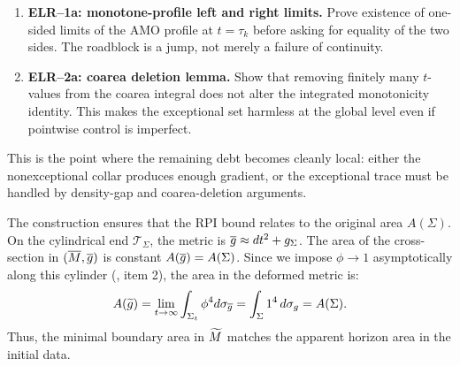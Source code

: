 \begin{remark}
\begin{enumerate}
    \item \textbf{ELR--1a: monotone-profile left and right limits.}
    Prove existence of one-sided limits of the AMO profile at \(t=\tau_k\)
    before asking for equality of the two sides.  The roadblock is a jump, not
    merely a failure of continuity.

    \item \textbf{ELR--2a: coarea deletion lemma.}
    Show that removing finitely many \(t\)-values from the coarea integral
    does not alter the integrated monotonicity identity.  This makes the
    exceptional set harmless at the global level even if pointwise control is
    imperfect.
\end{enumerate}
This is the point where the remaining debt becomes cleanly local: either the
nonexceptional collar produces enough gradient, or the exceptional trace must
be handled by density-gap and coarea-deletion arguments.
\end{remark}

\begin{proposition}\label{prop:AreaPreservation}
The construction ensures that the RPI bound relates to the original area $A(\Sigma)$.
On the cylindrical end $\mathcal{T}_\Sigma$, the metric is $\overline{g} \approx dt^2 + g_{\Sigma}$.
The area of the cross-section in $(\overline{M}, \overline{g})$ is constant $A(\overline{g}) = A(\Sigma)$.
Since we impose $\phi \to 1$ asymptotically along this cylinder (, item 2), the area in the deformed metric is:
\[ A(\widetilde{g}) = \lim_{t \to \infty} \int_{\Sigma_t} \phi^4 d\sigma_{\overline{g}} = \int_{\Sigma} 1^4 \, d\sigma_{g} = A(\Sigma). \]
Thus, the minimal boundary area in $\widetilde{M}$ matches the apparent horizon area in the initial data.
\end{proposition}
